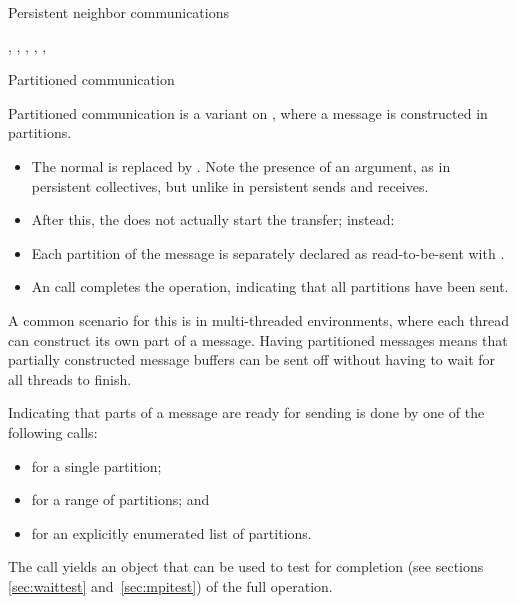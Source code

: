  {Persistent neighbor communications}

\begin{mpifour}

  \begin{raggedlist} %
    ,
    ,
    ,
    ,
    ,
  \end{raggedlist} %

\end{mpifour}

 {Partitioned communication}
\begin{mpifour}
\label{sec:psend}

Partitioned communication is a variant
on ,
where a message is constructed in partitions.
\begin{itemize}
\item The normal  is replaced
  by .
  Note the presence of an  argument,
  as in persistent collectives, but unlike in persistent sends and receives.
\item After this, the  does not
  actually start the transfer; instead:
\item Each partition of the message is separately
  declared as read-to-be-sent with .
\item An  call completes the operation,
  indicating that all partitions have been sent.
\end{itemize}
A common scenario for this is in multi-threaded environments,
where each thread can construct its own part of a message.
Having partitioned messages means that partially constructed message buffers
can be sent off without having to wait for all threads to finish.

Indicating that parts of a message are ready for sending
is done by one of the following calls:
\begin{itemize}
\item {} for a single partition;
\item {} for a range of partitions; and
\item {} for an explicitly enumerated list of partitions.
\end{itemize}
The  call yields an  object
that can be used to test for completion
(see sections \ref{sec:waittest} and~\ref{sec:mpitest})
of the full operation.


\end{mpifour}
